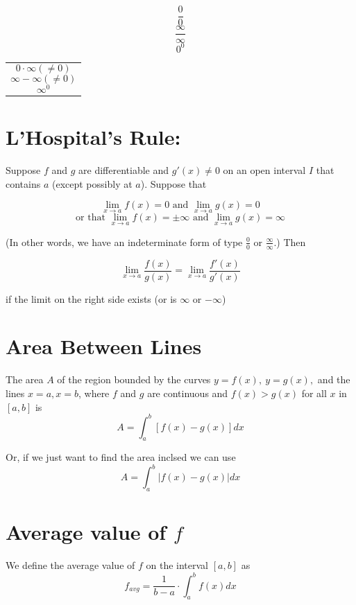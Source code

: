 \documentclass[12pt]{article}
\begin{document}
\begin{minipage}{0.45\textwidth}

$$ \frac{0}{0}$$
$$ \frac{\infty}{\infty}$$
$$ 0^0$$\hfill
\end{minipage}
\begin{minipage}{0.45\textwidth}

\begin{tabular}{|p{\textwidth}}

$$0 \cdot \infty (\neq{} 0)$$
$$\infty - \infty (\neq{} 0)$$
$$\infty^0$$

\end{tabular}
\end{minipage}

\section{L'Hospital's Rule:} Suppose $f$ and $g$ are differentiable and $g'(x) \neq{} 0$ on an open interval $I$ that contains $a$ (except possibly at $a$). Suppose that 

$$\lim_{x\to a} f(x)  = 0  \text{ and  } \lim_{x \to a} g(x) = 0$$
$$\text{or that } \lim_{x\to a} f(x)  = \pm \infty  \text{ and  } \lim_{x \to a} g(x) = \infty$$

\noindent (In other words, we have an indeterminate form of type $\frac{0}{0}$ or $\frac{\infty}{\infty}$.) Then

$$\lim_{x\to a} \frac{f(x)}{g(x)} = \lim_{x\to a} \frac{f'(x)}{g'(x)}$$

\noindent if the limit on the right side exists (or is $\infty$ or $-\infty$)



\section{Area Between Lines} The area $A$ of the region bounded by the curves $y=f(x),~y = g(x),$ and the lines $x=a, x=b$, where $f$ and $g$ are continuous and $f(x)>g(x)$ for  all $x$ in $[a,b]$ is 
$$A = \int_a^b \left[ f(x) - g(x) \right] dx$$

\noindent Or, if we just want to find the area inclsed we can use 
$$A = \int_a^b \left| f(x) - g(x) \right| dx$$


\section{Average value of $f$}
We define the average value of $f$ on the interval $[a,b]$ as 
$$f_{avg}= \frac{1}{b-a} \cdot \int_a^b f(x) dx$$
\end{document}
